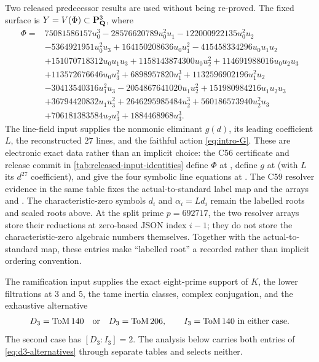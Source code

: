 Two released predecessor results are used without being re-proved.  The fixed
surface is $Y=V(\Phi)\subset\mathbf P^3_{\mathbf{Q}}$, where
\begin{equation*}
\begin{aligned}
\Phi={}&75081586157u_0^3-28576620789u_0^2u_1-122000922135u_0^2u_2\\
&-5364921951u_0^2u_3+164150208636u_0u_1^2-415458334296u_0u_1u_2\\
&+151070718312u_0u_1u_3+1158143874300u_0u_2^2
  +114691988016u_0u_2u_3\\
&+113572676646u_0u_3^2+6898957820u_1^3+1132596902196u_1^2u_2\\
&-30413540316u_1^2u_3-2054867641020u_1u_2^2
  +151980984216u_1u_2u_3\\
&+36794420832u_1u_3^2+2646295985484u_2^3
  +560186573940u_2^2u_3\\
&+706181383584u_2u_3^2+1884468968u_3^3.
\end{aligned}
\end{equation*}
The line-field input supplies the nonmonic eliminant $g(d)$, its leading
coefficient $L$, the reconstructed $27$ lines, and the faithful action
\eqref{eq:intro-G}.  These are electronic exact data rather than an implicit
choice: the C56 certificate and release commit in
\cref{tab:released-input-identities} define $\Phi$ at
, define $g$ at
 (with $L$ its
$d^{27}$ coefficient), and give the four symbolic line equations at
.  The C59 resolver
evidence in the same table fixes the actual-to-standard label map and the
arrays
 and
.  The
characteristic-zero symbols $d_i$ and $\alpha_i=Ld_i$ remain the labelled
roots and scaled roots above.  At the split prime $p=692717$, the two resolver
arrays store their reductions at zero-based JSON index $i-1$; they do not
store the characteristic-zero algebraic numbers themselves.  Together with
the actual-to-standard map, these entries make ``labelled root'' a recorded
rather than implicit ordering convention.

The ramification input supplies the exact eight-prime support of $K$, the
lower filtrations at $3$ and $5$, the tame inertia classes, complex
conjugation, and the exhaustive alternative
\begin{equation}
 D_3=\mathrm{ToM}\,140
 \quad\text{or}\quad
 D_3=\mathrm{ToM}\,206,
 \qquad I_3=\mathrm{ToM}\,140
 \text{ in either case}.
 \label{eq:d3-alternatives}
\end{equation}
The second case has $[D_3:I_3]=2$.  The analysis below carries both entries
of \eqref{eq:d3-alternatives} through separate tables and selects neither.

